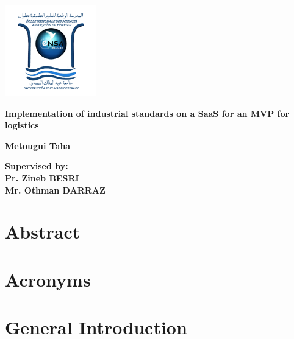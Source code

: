 \documentclass[oneside]{book}
\begin{document}
    \thispagestyle{empty}

    \begin{titlepage}
        \begin{center}
            \includegraphics[width=150px]{images/logoEnsa}

            \vspace*{2cm}

            \Large
            \textbf{Implementation of industrial standards on a SaaS for an MVP for logistics}

            \vspace{0.5cm}
            \large
            \textbf{Metougui Taha}

            \vspace{1.5 cm}

            \textbf{Supervised by:}\\
            \vspace{0.5cm}
            \textbf{Pr. Zineb BESRI}\\
            \vspace{0.5cm}
            \textbf{Mr. Othman DARRAZ}

            \vspace{0.8 cm}
        \end{center}
    \end{titlepage}

    \frontmatter

    \chapter*{Abstract}

    \chapter*{Acronyms}\label{sec:acronyms}
    

    \tableofcontents

    \mainmatter

    \chapter{General Introduction}\label{sec:introduction}
    
\end{document}

